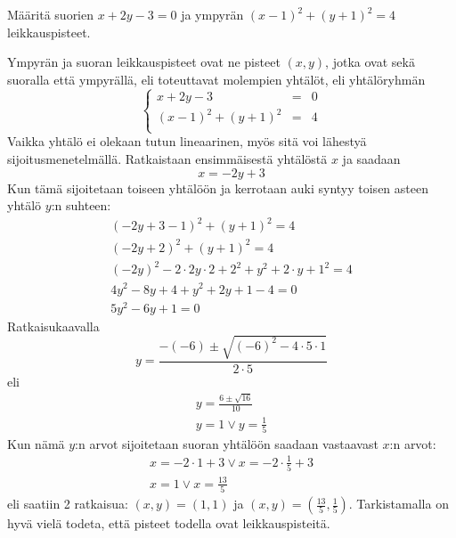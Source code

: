 
\begin{esimerkki}
Määritä suorien $x+2y-3=0$ ja ympyrän $(x-1)^2+(y+1)^2=4 $ leikkauspisteet.

\begin{esimratk}

Ympyrän ja suoran leikkauspisteet ovat ne pisteet $(x, y)$, jotka ovat sekä suoralla että ympyrällä, eli toteuttavat molempien yhtälöt, eli yhtälöryhmän
$$\left\{    
    \begin{array}{rcl}
        x+2y-3 &=&0 \\
        (x-1)^2+(y+1)^2 &=&4 \\
    \end{array}
    \right.$$
Vaikka yhtälö ei olekaan tutun lineaarinen, myös sitä voi lähestyä sijoitusmenetelmällä. Ratkaistaan ensimmäisestä yhtälöstä $x$ ja saadaan
\[
x = -2y+3
\]
Kun tämä sijoitetaan toiseen yhtälöön ja kerrotaan auki syntyy toisen asteen yhtälö $y$:n suhteen:
\begin{align*}
(-2y+3-1)^2+(y+1)^2=4 \\
(-2y+2)^2+(y+1)^2=4 \\
(-2y)^2-2\cdot 2y\cdot 2 +2^2+y^2+2\cdot y+1^2=4 \\
4y^2-8y+4+y^2+2y+1-4 = 0 \\
5y^2-6y+1 = 0
\end{align*}
Ratkaisukaavalla
\[
y = \frac{-(-6)\pm\sqrt{(-6)^2-4\cdot 5\cdot 1}}{2\cdot5}
\]
eli
\begin{align*}
y = \frac{6\pm\sqrt{16}}{10} \\
y = 1 \vee y = \frac{1}{5}
\end{align*}
Kun nämä $y$:n arvot sijoitetaan suoran yhtälöön saadaan vastaavast $x$:n arvot:
\begin{align*}
x = -2\cdot 1+3 \vee x = -2\cdot\frac{1}{5}+3 \\
x = 1 \vee x = \frac{13}{5}
\end{align*}
eli saatiin 2 ratkaisua: $(x, y) = (1, 1)$ ja $(x, y) = (\frac{13}{5}, \frac{1}{5})$. Tarkistamalla on hyvä vielä todeta, että pisteet todella ovat leikkauspisteitä.


\end{esimratk}
\end{esimerkki}

